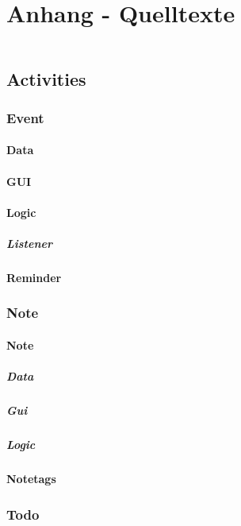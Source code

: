 \section{Anhang - Quelltexte}
\label{instal}

\begin{figure}[H]
\begin{lstlisting}[caption=Titel (Vorname Nachname)]

\end{lstlisting}
\end{figure}


\subsection{Activities}
	\subsubsection{Event}
		\paragraph{Data}
		\paragraph{GUI}
		\paragraph{Logic}
			\subparagraph{Listener}
		\paragraph{Reminder}
	\subsubsection{Note}
		\paragraph{Note}
			\subparagraph{Data}
			\subparagraph{Gui}
			\subparagraph{Logic}
		\paragraph{Notetags}
	\subsubsection{Todo}
